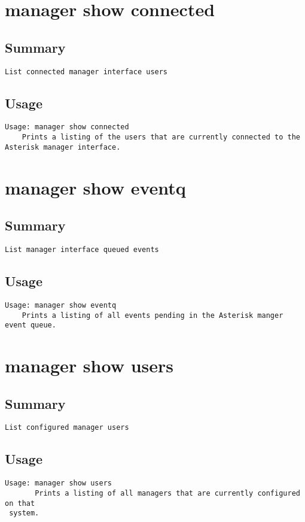 \section{manager show connected}
\subsection{Summary}
\begin{verbatim}
List connected manager interface users
\end{verbatim}
\subsection{Usage}
\begin{verbatim}
Usage: manager show connected
	Prints a listing of the users that are currently connected to the
Asterisk manager interface.

\end{verbatim}


\section{manager show eventq}
\subsection{Summary}
\begin{verbatim}
List manager interface queued events
\end{verbatim}
\subsection{Usage}
\begin{verbatim}
Usage: manager show eventq
	Prints a listing of all events pending in the Asterisk manger
event queue.

\end{verbatim}


\section{manager show users}
\subsection{Summary}
\begin{verbatim}
List configured manager users
\end{verbatim}
\subsection{Usage}
\begin{verbatim}
Usage: manager show users
       Prints a listing of all managers that are currently configured on that
 system.

\end{verbatim}


